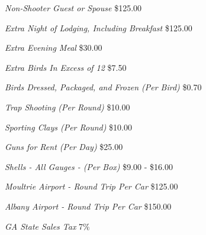\documentclass[margin, 11pt]{res}
\begin{document}
\begin{resume}
{\sl Non-Shooter Guest or Spouse} \hfill \$125.00\\
\vspace{-.05 truein}

{\sl Extra Night of Lodging, Including Breakfast} \hfill \$125.00\\
\vspace{-.05 truein}

{\sl Extra Evening Meal} \hfill \$30.00\\
\vspace{-.05 truein}

{\sl Extra Birds In Excess of 12} \hfill \$7.50\\
\vspace{-.05 truein}

{\sl Birds Dressed, Packaged, and Frozen (Per Bird)} \hfill \$0.70\\
\vspace{-.05 truein}

{\sl Trap Shooting (Per Round)} \hfill \$10.00\\
\vspace{-.05 truein}

{\sl Sporting Clays (Per Round)} \hfill \$10.00\\
\vspace{-.05 truein}

{\sl Guns for Rent (Per Day)} \hfill \$25.00\\
\vspace{-.05 truein}

{\sl Shells - All Gauges - (Per Box)} \hfill \$9.00 - \$16.00\\
\vspace{-.05 truein}

{\sl Moultrie Airport - Round Trip Per Car} \hfill \$125.00\\
\vspace{-.05 truein}

{\sl Albany Airport - Round Trip Per Car} \hfill \$150.00\\
\vspace{-.05 truein}

{\sl GA State Sales Tax} \hfill 7\%\\
\vspace{-.05 truein}



\end{resume}
\end{document}
